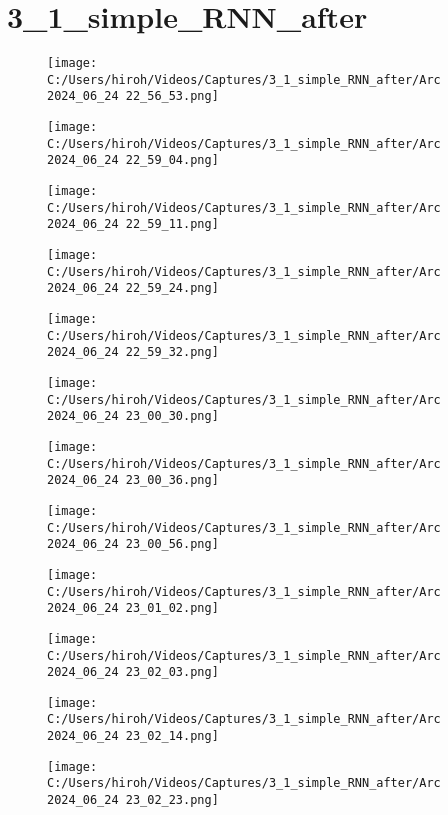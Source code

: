 \documentclass{ltjsarticle}
\begin{document}
\section{3\_1\_simple\_RNN\_after}
\begin{figure}[htbp]
  \centering
  \texttt{[image: C:/Users/hiroh/Videos/Captures/3\_1\_simple\_RNN\_after/Arc 2024\_06\_24 22\_56\_53.png]}
\end{figure}
\begin{figure}[htbp]
  \centering
  \texttt{[image: C:/Users/hiroh/Videos/Captures/3\_1\_simple\_RNN\_after/Arc 2024\_06\_24 22\_59\_04.png]}
\end{figure}
\begin{figure}[htbp]
  \centering
  \texttt{[image: C:/Users/hiroh/Videos/Captures/3\_1\_simple\_RNN\_after/Arc 2024\_06\_24 22\_59\_11.png]}
\end{figure}
\begin{figure}[htbp]
  \centering
  \texttt{[image: C:/Users/hiroh/Videos/Captures/3\_1\_simple\_RNN\_after/Arc 2024\_06\_24 22\_59\_24.png]}
\end{figure}
\begin{figure}[htbp]
  \centering
  \texttt{[image: C:/Users/hiroh/Videos/Captures/3\_1\_simple\_RNN\_after/Arc 2024\_06\_24 22\_59\_32.png]}
\end{figure}
\begin{figure}[htbp]
  \centering
  \texttt{[image: C:/Users/hiroh/Videos/Captures/3\_1\_simple\_RNN\_after/Arc 2024\_06\_24 23\_00\_30.png]}
\end{figure}
\begin{figure}[htbp]
  \centering
  \texttt{[image: C:/Users/hiroh/Videos/Captures/3\_1\_simple\_RNN\_after/Arc 2024\_06\_24 23\_00\_36.png]}
\end{figure}
\begin{figure}[htbp]
  \centering
  \texttt{[image: C:/Users/hiroh/Videos/Captures/3\_1\_simple\_RNN\_after/Arc 2024\_06\_24 23\_00\_56.png]}
\end{figure}
\begin{figure}[htbp]
  \centering
  \texttt{[image: C:/Users/hiroh/Videos/Captures/3\_1\_simple\_RNN\_after/Arc 2024\_06\_24 23\_01\_02.png]}
\end{figure}
\begin{figure}[htbp]
  \centering
  \texttt{[image: C:/Users/hiroh/Videos/Captures/3\_1\_simple\_RNN\_after/Arc 2024\_06\_24 23\_02\_03.png]}
\end{figure}
\begin{figure}[htbp]
  \centering
  \texttt{[image: C:/Users/hiroh/Videos/Captures/3\_1\_simple\_RNN\_after/Arc 2024\_06\_24 23\_02\_14.png]}
\end{figure}
\begin{figure}[htbp]
  \centering
  \texttt{[image: C:/Users/hiroh/Videos/Captures/3\_1\_simple\_RNN\_after/Arc 2024\_06\_24 23\_02\_23.png]}
\end{figure}
\end{document}
